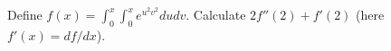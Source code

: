 Define $f(x) = \displaystyle \int_0^x \int_0^x e^{u^2 v^2} du dv$.
Calculate $2f''(2) + f'(2)$ (here $f'(x) = df/dx$).
